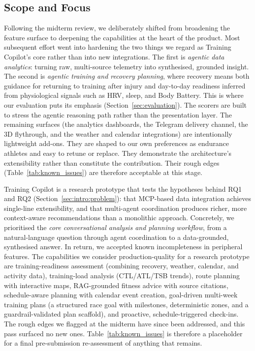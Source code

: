 \subsection{Scope and Focus}\label{sec:discussion:scope}

Following the midterm review, we deliberately shifted from broadening the feature surface to deepening the capabilities at the heart of the product. Most subsequent effort went into hardening the two things we regard as Training Copilot's core rather than into new integrations. The first is \textit{agentic data analytics}: turning raw, multi-source telemetry into synthesised, grounded insight. The second is \textit{agentic training and recovery planning}, where recovery means both guidance for returning to training after injury and day-to-day readiness inferred from physiological signals such as HRV, sleep, and Body Battery. This is where our evaluation puts its emphasis (Section~\ref{sec:evaluation}). The scorers are built to stress the agentic reasoning path rather than the presentation layer. The remaining surfaces (the analytics dashboards, the Telegram delivery channel, the 3D flythrough, and the weather and calendar integrations) are intentionally lightweight add-ons. They are shaped to our own preferences as endurance athletes and easy to retune or replace. They demonstrate the architecture's extensibility rather than constitute the contribution. Their rough edges (Table~\ref{tab:known_issues}) are therefore acceptable at this stage.

Training Copilot is a research prototype that tests the hypotheses behind RQ1 and RQ2 (Section~\ref{sec:intro:problem}): that MCP-based data integration achieves single-line extensibility, and that multi-agent coordination produces richer, more context-aware recommendations than a monolithic approach. Concretely, we prioritised the \textit{core conversational analysis and planning workflow}, from a natural-language question through agent coordination to a data-grounded, synthesised answer. In return, we accepted known incompleteness in peripheral features. The capabilities we consider production-quality for a research prototype are training-readiness assessment (combining recovery, weather, calendar, and activity data), training-load analysis (CTL/ATL/TSB trends), route planning with interactive maps, RAG-grounded fitness advice with source citations, schedule-aware planning with calendar event creation, goal-driven multi-week training plans (a structured race goal with milestones, deterministic zones, and a guardrail-validated plan scaffold), and proactive, schedule-triggered check-ins. The rough edges we flagged at the midterm have since been addressed, and this pass surfaced no new ones. Table~\ref{tab:known_issues} is therefore a placeholder for a final pre-submission re-assessment of anything that remains.


